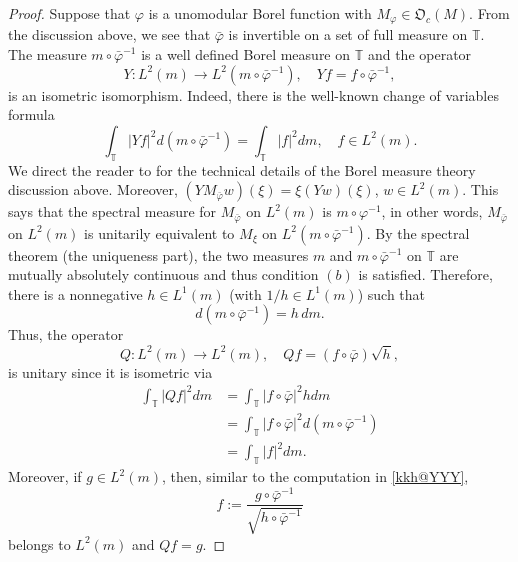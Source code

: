 \documentclass{dis}
\theoremstyle{plain}
\theoremstyle{definition}
\def\T{\mathbb{T}}
\renewcommand{\phi}{\varphi}
\newcommand{\0}{{\color{lightgray}0}}
\begin{document}
\begin{proof}
Suppose that $\phi$ is a unomodular Borel function  with $M_{\phi} \in \mathfrak{O}_c(M)$. From the discussion above, we see that  $\bar \phi$ is invertible on a set of full measure on $\T$. The measure $m \circ \bar \phi^{-1}$ is a well defined Borel measure on $\T$ and the operator
$$Y: L^2(m) \to L^2(m \circ \bar \phi^{-1}), \quad Y f = f \circ  \bar \phi^{-1},$$ is an isometric isomorphism. Indeed, there is the well-known change of variables formula
\begin{equation}\label{kkh@YYY}
\int_{\T} |Y f|^2 d(m \circ \bar \phi^{-1}) = \int_{\T} |f|^2 d m, \quad f \in L^2(m).
\end{equation}
We direct the reader to \cite[p.~162-163]{MR33869} for the technical details of the Borel measure theory discussion above. 
Moreover, $(Y M_{\bar \phi} w)(\xi) = \xi (Y w)(\xi)$, $w \in L^2(m)$. This says that the spectral measure for $M_{\bar \phi}$ on $L^2(m)$ is $m \circ \phi^{-1}$, in other words, $M_{\bar \phi}$ on $L^2(m)$ is unitarily equivalent to $M_{\xi}$ on $L^2(m \circ \bar \phi^{-1})$. By the spectral theorem (the uniqueness part), the two measures $m$ and $m \circ \bar \phi^{-1}$ on $\T$ are mutually absolutely continuous and thus condition $(b)$ is satisfied. Therefore,  there is a nonnegative $h \in L^1(m)$ (with $1/h \in L^1(m)$) such that 
$$d (m \circ \bar \phi^{-1}) = h\,dm.$$ Thus,  the operator 
\begin{equation}\label{kkk9900888GG}
Q: L^2(m) \to L^2(m), \quad Q f  = (f \circ \bar \phi) \sqrt{h},
\end{equation}
 is unitary since it is isometric via 
\begin{align*}
\int_{\T} |Q f|^2 dm & = \int_{\T} |f \circ \bar \phi|^2 h dm\\
& = \int_{\T} |f \circ \bar \phi|^2 d(m \circ \bar \phi^{-1})\\
& = \int_{\T} |f|^2 dm.
\end{align*}
Moreover, if $g \in L^2(m)$, then, similar to the computation in \eqref{kkh@YYY}, 
$$f := \frac{g \circ \bar \phi^{-1}}{\sqrt{h \circ \bar \phi^{-1}}}$$
belongs to $L^2(m)$ and $Q f = g$.


\end{proof}
\end{document}
